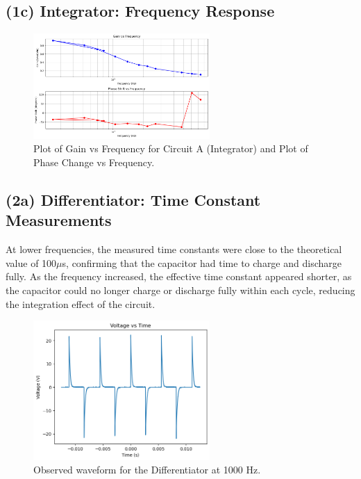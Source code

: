 \documentclass{article}
\begin{document}
\subsection{(1c) Integrator: Frequency Response}

\begin{figure}[H]
    \centering
    \includegraphics[width=0.6\textwidth]{./img/Lab2_1c.png}  %
    \caption{Plot of Gain vs Frequency for Circuit A (Integrator) and Plot of Phase Change vs Frequency.}
\end{figure}

\subsection{(2a) Differentiator: Time Constant Measurements}
At lower frequencies, the measured time constants were close to the theoretical value of 
100$\mu$s, confirming that the capacitor had time to charge and discharge fully. As the frequency 
increased, the effective time constant appeared shorter, as the capacitor could no longer 
charge or discharge fully within each cycle, reducing the integration effect of the circuit.

\begin{figure}[H]
    \centering
    \includegraphics[width=0.6\textwidth]{./img/Lab2_2a.png}
    \caption{Observed waveform for the Differentiator at 1000 Hz.}
\end{figure}
\end{document}
